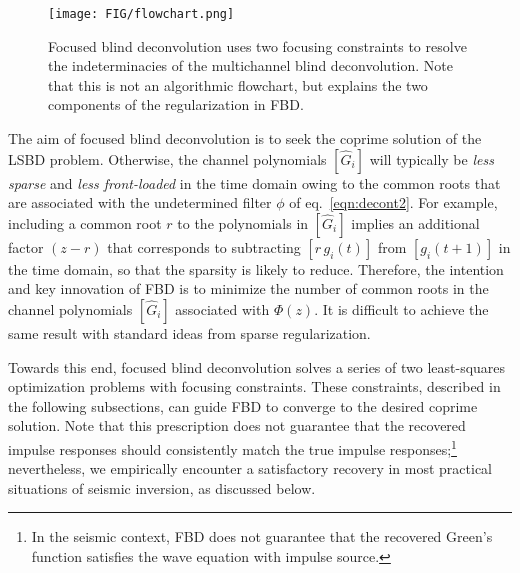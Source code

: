 \documentclass{article}
\theoremstyle{definition}
\def\vecc#1{[#1]}
\begin{document}
{\begin{figure*}
	\centering
	{
	\texttt{[image: FIG/flowchart.png]}
		}
	{
	
	}
	\caption{Focused blind deconvolution uses two focusing constraints to resolve the 
	indeterminacies of the multichannel blind deconvolution. 
	Note that this is not an algorithmic flowchart, but
	explains the two components of the regularization in FBD.}
	\label{fig:fbd_parts}
\end{figure*}

The aim of focused blind deconvolution is to seek the coprime solution
of the
LSBD problem.
%
Otherwise, 
the channel polynomials $\vecc{\hat{G}_i}$ will typically be 
\emph{less sparse} and \emph{less front-loaded}
in the time domain owing to the common roots
that are 
associated with the
undetermined filter $\phi$ of eq.~\ref{eqn:decont2}.
%
For example,
including a common root $r$ to the 
polynomials in $\vecc{\hat{G}_i}$ implies an additional factor $(z-r)$ that 
corresponds to 
subtracting $\vecc{r\,g_i(t)}$ from $\vecc{g_i(t+1)}$ in the time domain,
so that the sparsity is likely to reduce.
%
Therefore, 
the intention and key innovation of FBD is to minimize the number of common roots 
in the channel polynomials $\vecc{\hat{G}_i}$ associated with $\Phi(z)$.
%
It is difficult to achieve the same result with standard 
ideas from sparse regularization.

%
%
Towards this end, 
focused blind deconvolution solves a series  
of two least-squares optimization problems
with
focusing constraints. 
These constraints, 
described in the following subsections, can guide FBD to converge to the desired coprime solution.
%
Note that
this prescription does not guarantee
that the recovered impulse responses 
should consistently 
match the true impulse responses;\footnote{In the seismic context, FBD does not guarantee 
that the recovered Green's function satisfies the wave equation with impulse source.}
nevertheless, we empirically 
encounter a 
satisfactory recovery in most practical situations 
of seismic inversion,
as discussed below.
%


}
\end{document}
